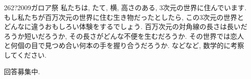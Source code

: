 \begin{prob}{262}{\hosi ?}{2009ガロア祭}
私たちは, たて, 横, 高さのある, 3次元の世界に住んでいます. もし私たちが百万次元の世界に住む生き物だったとしたら, この3次元の世界とどんなに違うおもしろい体験をするでしょう. 百万次元の対角線の長さは長いだろうか短いだろうか, その長さがどんな不便を生むだろうか. その世界では恋人と何個の目で見つめ合い何本の手を握り合うだろうか. などなど, 数学的に考察してください.
\end{prob}

回答募集中. 